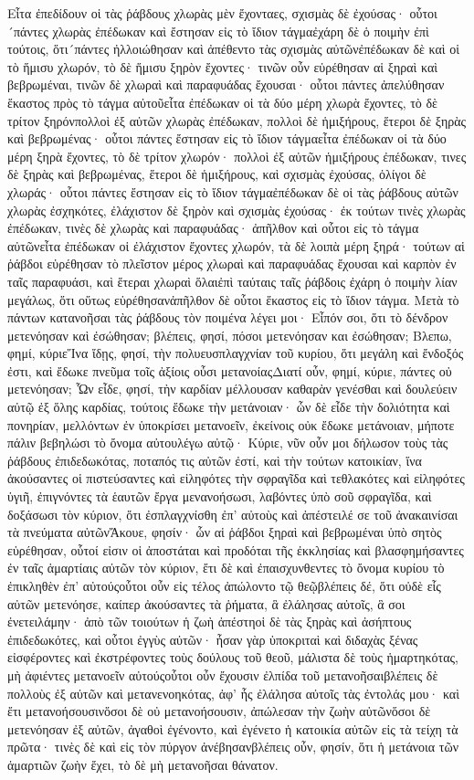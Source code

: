 Εἶτα ἐπεδίδουν οἱ τὰς ῥάβδους χλωρὰς μὲν ἔχονταες, σχισμὰς δὲ ἐχούσας· οὗτοι´πάντες χλωρὰς ἐπέδωκαν καὶ ἔστησαν εἰς τὸ ἴδιον τάγμαἐχάρη δὲ ὁ ποιμὴν ἐπὶ τούτοις, ὅτι´πάντες ἠλλοιώθησαν καὶ ἀπέθεντο τὰς σχισμὰς αὐτῶνἐπέδωκαν δὲ καὶ οἱ τὸ ἥμισυ χλωρόν, τὸ δὲ ἥμισυ ξηρὸν ἔχοντες· τινῶν οὖν εὑρέθησαν αἱ ξηραὶ καὶ βεβρωμέναι, τινῶν δὲ χλωραὶ καὶ παραφυάδας ἔχουσαι· οὗτοι πάντες ἀπελύθησαν ἕκαστος πρὸς τὸ τάγμα αὐτοῦεἶτα ἐπέδωκαν οἱ τὰ δύο μέρη χλωρὰ ἔχοντες, τὸ δὲ τρίτον ξηρόνπολλοὶ ἐξ αὐτῶν χλωρὰς ἐπέδωκαν, πολλοὶ δὲ ἡμιξήρους, ἕτεροι δὲ ξηρὰς καὶ βεβρωμένας· οὗτοι πάντες ἔστησαν εἰς τὸ ἴδιον τάγμαεἶτα ἐπέδωκαν οἱ τὰ δύο μέρη ξηρὰ ἔχοντες, τὸ δὲ τρίτον χλωρόν· πολλοὶ ἐξ αὐτῶν ἡμιξήρους ἐπέδωκαν, τινες δὲ ξηρὰς καὶ βεβρωμένας, ἕτεροι δὲ ἡμιξήρους, καὶ σχισμὰς ἐχούσας, ὀλίγοι δὲ χλωράς· οὗτοι πάντες ἔστησαν εἰς τὸ ἴδιον τάγμαἐπέδωκαν δὲ οἱ τὰς ῥάβδους αὐτῶν χλωρὰς ἐσχηκότες, ἐλάχιστον δὲ ξηρὸν καὶ σχισμὰς ἐχούσας· ἐκ τούτων τινὲς χλωρὰς ἐπέδωκαν, τινὲς δὲ χλωρὰς καὶ παραφυάδας· ἀπῆλθον καὶ οὗτοι εἰς τὸ τάγμα αὐτῶνεἶτα ἐπέδωκαν οἱ ἐλάχιστον ἔχοντες χλωρόν, τὰ δὲ λοιπὰ μέρη ξηρά· τούτων αἱ ῥάβδοι εὑρέθησαν τὸ πλεῖστον μέρος χλωραὶ καὶ παραφυάδας ἔχουσαι καὶ καρπὸν ἐν ταῖς παραφυάσι, καὶ ἕτεραι χλωραὶ ὅλαιἐπὶ ταύταις ταῖς ῥάβδοις ἐχάρη ὁ ποιμὴν λίαν μεγάλως, ὅτι οὕτως εὑρέθησανἀπῆλθον δὲ οὗτοι ἕκαστος εἰς τὸ ἴδιον τάγμα.
Μετὰ τὸ πάντων κατανοῆσαι τὰς ῥάβδους τὸν ποιμένα λέγει μοι· Εἶπόν σοι, ὅτι τὸ δένδρον μετενόησαν καὶ ἐσώθησαν; βλέπεις, φησί, πόσοι μετενόησαν και ἐσώθησαν; Βλεπω, φημί, κύριεἽνα ἴδῃς, φησί, τὴν πολυευσπλαγχνίαν τοῦ κυρίου, ὅτι μεγάλη καὶ ἔνδοξός ἐστι, καὶ ἔδωκε πνεῦμα τοῖς ἀξίοις οὖσι μετανοίαςΔιατί οὖν, φημί, κύριε, πάντες οὐ μετενόησαν; Ὧν εἶδε, φησί, τὴν καρδίαν μέλλουσαν καθαρὰν γενέσθαι καὶ δουλεύειν αὐτῷ ἐξ ὅλης καρδίας, τούτοις ἔδωκε τὴν μετάνοιαν· ὧν δὲ εἶδε τὴν δολιότητα καὶ πονηρίαν, μελλόντων ἐν ὑποκρίσει μετανοεῖν, ἐκείνοις οὐκ ἔδωκε μετάνοιαν, μήποτε πάλιν βεβηλώσι τὸ ὄνομα αὐτουλέγω αὐτῷ· Κύριε, νῦν οὖν μοι δήλωσον τοὺς τὰς ῥάβδους ἐπιδεδωκότας, ποταπός τις αὐτῶν ἐστί, καὶ τὴν τούτων κατοικίαν, ἵνα ἀκούσαντες οἱ πιστεύσαντες καὶ εἰληφότες τὴν σφραγῖδα καὶ τεθλακότες καὶ εἰληφότες ὑγιῆ, ἐπιγνόντες τὰ ἑαυτῶν ἔργα μενανοήσωσι, λαβόντες ὑπὸ σοῦ σφραγῖδα, καὶ δοξάσωσι τὸν κύριον, ὅτι ἐσπλαγχνίσθη ἐπ’ αὐτοὺς καὶ ἀπέστειλέ σε τοῦ ἀνακαινίσαι τὰ πνεύματα αὐτῶνἌκουε, φησίν· ὧν αἱ ῥάβδοι ξηραὶ καὶ βεβρωμέναι ὑπὸ σητὸς εὑρέθησαν, οὗτοί εἰσιν οἱ ἀποστάται καὶ προδόται τῆς ἐκκλησίας καὶ βλασφημήσαντες ἐν ταῖς ἁμαρτίαις αὐτῶν τὸν κύριον, ἔτι δὲ καὶ ἐπαισχυνθεντες τὸ ὄνομα κυρίου τὸ ἐπικληθὲν ἐπ’ αὐτούςοὗτοι οὖν εἰς τέλος ἀπώλοντο τῷ θεῷβλέπεις δέ, ὅτι οὐδὲ εἷς αὐτῶν μετενόησε, καίπερ ἀκούσαντες τὰ ῥήματα, ἃ ἐλάλησας αὐτοῖς, ἃ σοι ἐνετειλάμην· ἀπὸ τῶν τοιούτων ἡ ζωὴ ἀπέστηοἱ δὲ τὰς ξηρὰς καὶ ἀσήπτους ἐπιδεδωκότες, καὶ οὗτοι ἐγγὺς αὐτῶν· ἦσαν γὰρ ὑποκριταὶ καὶ διδαχὰς ξένας εἰσφέροντες καὶ ἐκστρέφοντες τοὺς δούλους τοῦ θεοῦ, μάλιστα δὲ τοὺς ἡμαρτηκότας, μὴ ἀφιέντες μετανοεῖν αὐτούςοὗτοι οὖν ἔχουσιν ἐλπίδα τοῦ μετανοῆσαιβλέπεις δὲ πολλοὺς ἐξ αὐτῶν καὶ μετανενοηκότας, ἀφ’ ἧς ἐλάλησα αὐτοῖς τὰς ἐντολάς μου· καὶ ἔτι μετανοήσουσινὅσοι δὲ οὐ μετανοήσουσιν, ἀπώλεσαν τὴν ζωὴν αὐτῶνὅσοι δὲ μετενόησαν ἐξ αὐτῶν, ἀγαθοὶ ἐγένοντο, καὶ ἐγένετο ἡ κατοικία αὐτῶν εἰς τὰ τείχη τὰ πρῶτα· τινὲς δὲ καὶ εἰς τὸν πύργον ἀνέβησανβλέπεις οὖν, φησίν, ὅτι ἡ μετάνοια τῶν ἁμαρτιῶν ζωὴν ἔχει, τὸ δὲ μὴ μετανοῆσαι θάνατον.
